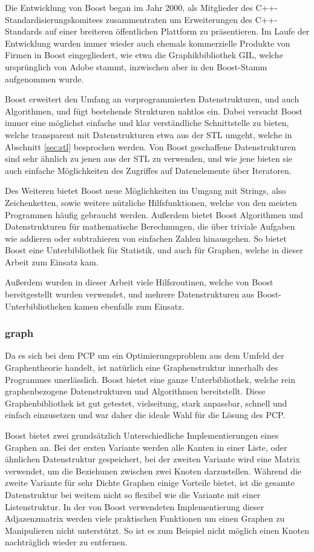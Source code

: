 Die Entwicklung von Boost began im Jahr 2000, als Mitglieder des C++\--Standardisierungs\-komitees zusammentraten um Erweiterungen des C++-Standards auf einer breiteren öffentlichen Plattform zu präsentieren.
Im Laufe der Entwicklung wurden immer wieder auch ehemals kommerzielle Produkte von Firmen in Boost eingegliedert, wie etwa die Graphikbibliothek GIL, welche ursprünglich von Adobe stammt, inzwischen
aber in den Boost-Stamm aufgenommen wurde.

Boost erweitert den Umfang an vorprogrammierten Datenstrukturen, und auch Algorithmen, und fügt bestehende Strukturen nahtlos ein. Dabei versucht Boost immer eine möglichst einfache und klar verständliche
Schnittstelle zu bieten, welche transparent mit Datenstrukturen etwa aus der STL umgeht, welche in Abschnitt \ref{sec:stl} besprochen werden. Von Boost geschaffene Datenstrukturen sind sehr ähnlich zu jenen
aus der STL zu verwenden, und wie jene bieten sie auch einfache Möglichkeiten des Zugriffes auf Datenelemente über Iteratoren. 

Des Weiteren bietet Boost neue Möglichkeiten im Umgang mit Strings, also Zeichenketten, sowie weitere nützliche Hilfsfunktionen, welche von den meisten Programmen häufig gebraucht werden. Außerdem bietet
Boost Algorithmen und Datenstrukturen für mathematische Berechnungen, die über triviale Aufgaben wie addieren oder subtrahieren von einfachen Zahlen hinausgehen. So bietet Boost eine Unterbibliothek für 
Statistik, und auch für Graphen, welche in dieser Arbeit zum Einsatz kam.

Außerdem wurden in dieser Arbeit viele Hilfsroutinen, welche von Boost bereitgestellt wurden verwendet, und mehrere Datenstrukturen aus Boost-Unterbibliotheken kamen ebenfalls zum Einsatz.

\subsubsection{graph}
\label{sec:boost:graph}
Da es sich bei dem PCP um ein Optimierungsproblem aus dem Umfeld der Graphentheorie handelt, ist natürlich eine Graphenstruktur innerhalb des Programmes unerlässlich. Boost bietet eine ganze Unterbibliothek, 
welche rein graphenbezogene Datenstrukturen und Algorithmen bereitstellt. Diese Graphenbibliothek ist gut getestet, vielseitung, stark anpassbar, schnell und einfach einzusetzen und war daher die ideale Wahl
für die Lösung des PCP.

Boost bietet zwei grundsätzlich Unterschiedliche Implementierungen eines Graphen an. Bei der ersten Variante werden alle Kanten in einer Liste, oder ähnlichen Datenstruktur gespeichert, bei
der zweiten Variante wird eine Matrix verwendet, um die Beziehunen zwischen zwei Knoten darzustellen. Während die zweite Variante für sehr Dichte Graphen einige Vorteile bietet, ist die gesamte
Datenstruktur bei weitem nicht so flexibel wie die Variante mit einer Listenstruktur. In der von Boost verwendeten Implementierung dieser Adjazenzmatrix werden viele praktischen Funktionen um einen
Graphen zu Manipulieren nicht unterstützt. So ist es zum Beispiel nicht möglich einen Knoten nachträglich wieder zu entfernen. 


